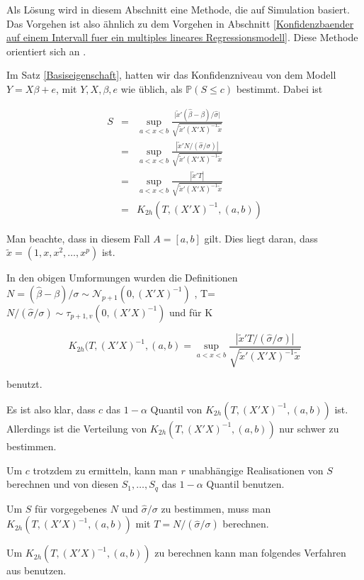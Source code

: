 \documentclass[12pt,a4paper]{article}
\theoremstyle{definition}
\theoremstyle{definition}
\theoremstyle{definition}
\begin{document}
Als Lösung wird in diesem Abschnitt eine Methode, die auf Simulation basiert. Das Vorgehen ist also ähnlich zu dem Vorgehen in Abschnitt \ref{Konfidenzbaender auf einem Intervall fuer ein multiples lineares Regressionsmodell}. Diese Methode orientiert sich an \cite[183,184]{Liu64}.

Im Satz \ref{Basiseigenschaft}, hatten wir das Konfidenzniveau von dem Modell $Y=X\beta+e$, mit $Y,X,\beta,e$ wie üblich, als $\mathbb{P}(S \leq c)$ bestimmt. Dabei ist

\begin{eqnarray*}
S &=& \sup_{a<x<b} \frac{\vert \tilde{x}'(\hat{\beta}-\beta) /\hat{\sigma} \vert}{\sqrt{\tilde{x}'(X'X)^{-1}\tilde{x}}} \\
&=& \sup_{a<x<b} \frac{|\tilde{x}'N/(\hat{\sigma}/\sigma)|}{\sqrt{\tilde{x}'(X'X)^{-1}\tilde{x}}} \\
&=& \sup_{a<x<b} \frac{| \tilde{x}'T |}{\sqrt{\tilde{x}'(X'X)^{-1}\tilde{x}}} \\
&=& K_{2h}(T,(X'X)^{-1},(a,b))
\end{eqnarray*}

Man beachte, dass in diesem Fall $A=[a,b]$ gilt. Dies liegt daran, dass $\tilde{x} = (1, x, x^2, \ldots, x^p)$ ist.

In den obigen Umformungen wurden die Definitionen $ N=(\hat{\beta}-\beta)/\sigma \sim \mathscr{N}_{p+1
} (0,(X'X)^{-1}) $ , \gls{T}=$N/(\hat{\sigma}/\sigma)\sim\tau_{p+1,v}(0,(X'X)^{-1}) $ und für \gls{K}

\begin{equation*}
K_{2h}(T,(X'X)^{-1},(a,b) = \sup_{a<x<b} \frac{|\tilde{x}'T/(\hat{\sigma}/\sigma)|}{\sqrt{\tilde{x}'(X'X)^{-1}\tilde{x}}}
\end{equation*}

benutzt.

Es ist also klar, dass $c$ das $1-\alpha$ Quantil von $K_{2h}(T,(X'X)^{-1},(a,b))$ ist. Allerdings ist die Verteilung von $K_{2h}(T,(X'X)^{-1},(a,b))$ nur schwer zu bestimmen.

Um $c$ trotzdem zu ermitteln, kann man $r$ unabhängige Realisationen von $S$ berechnen und von diesen $S_1, \ldots, S_q$ das $1-\alpha$ Quantil benutzen.

Um $S$ für vorgegebenes $N$ und $\hat{\sigma}/\sigma$ zu bestimmen, muss man $K_{2h}(T,(X'X)^{-1},(a,b))$ mit $T=N/(\hat{\sigma}/\sigma)$ berechnen. 

Um  $K_{2h}(T,(X'X)^{-1},(a,b))$ zu berechnen kann man folgendes Verfahren aus \cite[Appendix E]{Liu64}  benutzen.
\end{document}
